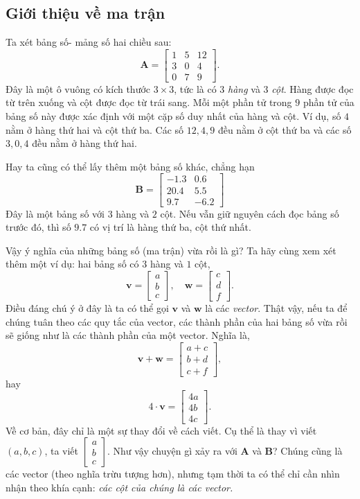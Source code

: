 \subsection{Giới thiệu về ma trận}
Ta xét bảng số- mảng số hai chiều sau:
\[ \mathbf{A}=
\begin{bmatrix}
    1&5&12\\
    3&0&4\\
    0&7&9
\end{bmatrix}.
\]
Đây là một ô vuông có kích thước \(3\times 3\), tức là có \(3\) \emph{hàng} và \(3\) \emph{cột}. Hàng được đọc từ trên xuống và cột được đọc từ trái sang. Mỗi một phần tử  trong \(9\) phần tử  của bảng số này được xác định với một cặp số duy nhất của hàng và cột. Ví dụ, số \(4\) nằm ở hàng thứ hai và cột thứ ba. 
Các số \(12,4,9\) đều nằm ở cột thứ ba và các số \(3,0,4\) đều nằm ở hàng thứ hai. 

Hay ta cũng có thể lấy thêm một bảng số khác, chẳng hạn
\[\mathbf{B}=\begin{bmatrix}
    -1.3&0.6\\
    20.4&5.5\\
    9.7&-6.2
\end{bmatrix}\] Đây là một bảng số với \(3\) hàng và \(2\) cột. Nếu vẫn giữ nguyên cách đọc bảng số trước đó, thì số \(9.7\) có vị trí là hàng thứ ba, cột thứ nhất. 

Vậy ý nghĩa của những bảng số (ma trận) vừa rồi là gì? Ta hãy cùng xem xét thêm một ví dụ: hai bảng số có \(3\) hàng và \(1\) cột, 
\[\mathbf{v}=\begin{bmatrix}
    a\\b\\c
\end{bmatrix}, \quad \mathbf{w}=\begin{bmatrix}
    c\\d\\f
\end{bmatrix}.
\] Điều đáng chú ý ở đây là ta có thể gọi \(\mathbf{v}\) và \(\mathbf{w}\) là các \emph{vector}. Thật vậy, nếu ta để chúng tuân theo các quy tắc của vector, các thành phần của hai bảng số vừa rồi sẽ giống như là các thành phần của một vector. 
Nghĩa là, \[\mathbf{v}+\mathbf{w}=\begin{bmatrix}
    a+c\\b+d\\c+f
\end{bmatrix},\] hay \[
    4\cdot\mathbf{v}=\begin{bmatrix}
        4a\\4b\\4c
\end{bmatrix}.\]
Về cơ bản, đây chỉ là một sự thay đổi về cách viết. Cụ thể là thay vì viết \((a,b,c)\), ta viết \(\begin{bmatrix}
    a\\b\\c
\end{bmatrix}\). Như vậy chuyện gì xảy ra với  \(\mathbf{A}\) và \(\mathbf{B} \)? Chúng cũng là các vector (theo nghĩa trừu tượng hơn), nhưng tạm thời ta có thể chỉ cần nhìn nhận theo khía cạnh: \emph{các cột của chúng là các vector. }
\vspace{8pt}


